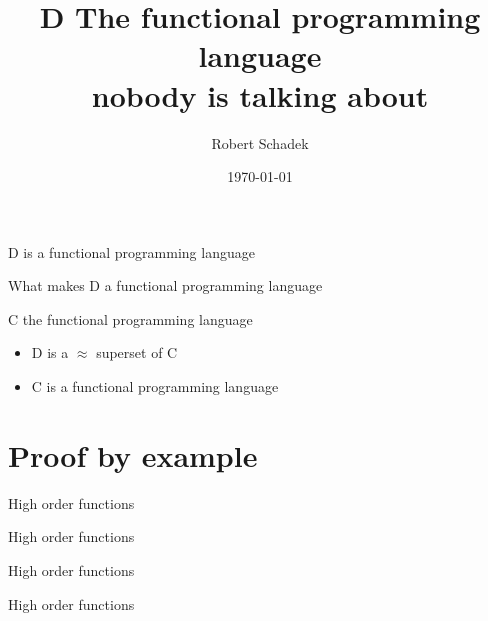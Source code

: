 \documentclass[aspectratio=169,notes]{beamer}
\title{D The functional programming language\\nobody is talking about}
\date{\today}
\author{Robert Schadek}
\begin{document}
	\maketitle

	\begin{frame}[fragile]{D is a functional programming language}
		\begin{center}
			{\large What makes D a functional programming language}
		\end{center}
	\end{frame}

	\begin{frame}{C the functional programming language}
		\begin{itemize}
			\item D is a $\approx$ superset of C
			\item C is a functional programming language
		\end{itemize}
	\end{frame}

	\section{Proof by example}
	\begin{frame}[fragile]{High order functions}
		
	\end{frame}

	\begin{frame}[fragile]{High order functions}
		
	\end{frame}

	\begin{frame}[fragile]{High order functions}
		
	\end{frame}

	\begin{frame}[fragile]{High order functions}
		
	\end{frame}
\end{document}
